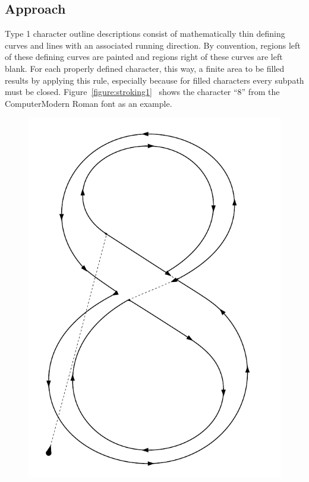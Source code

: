 \subsection{Approach}
Type 1 character outline descriptions consist of mathematically thin defining curves
and lines with an associated running direction. By convention, regions left of
these defining curves are painted and regions right of these curves are left
blank. For each properly defined character, this way, a finite area to be filled
results by applying this rule, especially because for filled characters every
subpath must be closed. Figure~\ref{figure:stroking1}~ shows the
character ``8'' from the ComputerModern Roman font as an example.
\begin{figure}[t]
\hfill
{}\includegraphics[scale=0.5]{t1dump/t1dump_eight}
\hfill

\end{figure}
